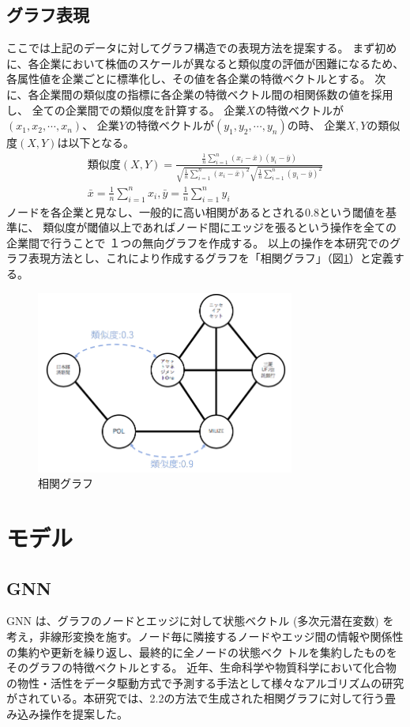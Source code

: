 \documentclass[twocolumn,10.5pt]{article}           %
\begin{document}
\subsection{グラフ表現}
ここでは上記のデータに対してグラフ構造での表現方法を提案する。
まず初めに、各企業において株価のスケールが異なると類似度の評価が困難になるため、
各属性値を企業ごとに標準化し、その値を各企業の特徴ベクトルとする。
次に、各企業間の類似度の指標に各企業の特徴ベクトル間の相関係数の値を採用し、
全ての企業間での類似度を計算する。
企業$X$の特徴ベクトルが$(x_1, x_2, \cdots, x_n)$、
企業$Y$の特徴ベクトルが$(y_1, y_2, \cdots, y_n)$の時、
企業$X, Y$の類似度$(X, Y)$は以下となる。
\begin{eqnarray}
	\mbox{類似度}(X, Y) = \frac{\frac{1}{n}\sum_{i=1}^{n}(x_i - \bar{x})(y_i - \bar{y})}{\sqrt{\frac{1}{n}\sum_{i=1}^{n}(x_i - \bar{x})^2}\sqrt{\frac{1}{n}\sum_{i=1}^{n}(y_i - \bar{y})^2}}\\
	\bar{x} = \frac{1}{n}\sum_{i=1}^{n}x_i, \bar{y} = \frac{1}{n}\sum_{i=1}^{n}y_i \nonumber
\end{eqnarray}
ノードを各企業と見なし、一般的に高い相関があるとされる0.8という閾値を基準に、
類似度が閾値以上であればノード間にエッジを張るという操作を全ての企業間で行うことで
１つの無向グラフを作成する。
以上の操作を本研究でのグラフ表現方法とし、これにより作成するグラフを「相関グラフ」（図\ref{graph}）と定義する。
\begin{figure}[h]
	\centering
	\includegraphics[width=85mm]{img/graph.png}
	\caption{相関グラフ}
	\label{graph}
\end{figure}

\section{モデル}
\subsection{GNN}
GNN は、グラフのノードとエッジに対して状態ベクトル (多次元潜在変数) を考え，非線形変換を施す。ノード毎に隣接するノードやエッジ間の情報や関係性の集約や更新を繰り返し、最終的に全ノードの状態ベク トルを集約したものをそのグラフの特徴ベクトルとする。
近年、生命科学や物質科学において化合物の物性・活性をデータ駆動方式で予測する手法として様々なアルゴリズムの研究がされている。本研究では、2.2の方法で生成された相関グラフに対して行う畳み込み操作を提案した。
\end{document}
